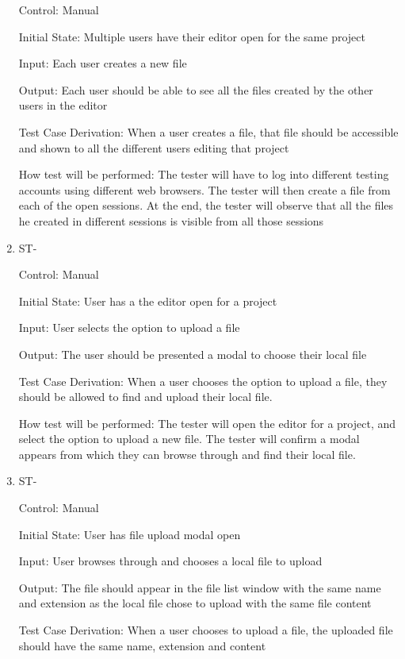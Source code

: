 \documentclass[12pt, titlepage]{article}
\newcounter{TESTID}
\newcommand\TESTNUM{\stepcounter{TESTID}\theTESTID}
\begin{document}
\begin{enumerate}
		Control: Manual
		
		Initial State: Multiple users have their editor open for the same project
		
		Input: Each user creates a new file
		
		Output: Each user should be able to see all the files created by the other users in the editor
		
		Test Case Derivation: When a user creates a file, that file should be accessible and shown to all the different users editing that project
		
		How test will be performed: The tester will have to log into different testing accounts using different web browsers. The tester will then create a file from each of the open sessions. At the end, the tester will observe that all the files he created in different sessions is visible from all those sessions
		
		\item{ST-\TESTNUM\\}
		
		Control: Manual
		
		Initial State: User has a the editor open for a project
		
		Input: User selects the option to upload a file
		
		Output: The user should be presented a modal to choose their local file
		
		Test Case Derivation: When a user chooses the option to upload a file, they should be allowed to find and upload their local file.
		
		How test will be performed: The tester will open the editor for a project, and select the option to upload a new file. The tester will confirm a modal appears from which they can browse through and find their local file.
		
		\item{ST-\TESTNUM\\}
		
		Control: Manual
		
		Initial State: User has file upload modal open
		
		Input: User browses through and chooses a local file to upload
		
		Output:  The file should appear in the file list window with the same name and extension as the local file chose to upload with the same file content
		
		Test Case Derivation: When a user chooses to upload a file, the uploaded file should have the same name, extension and content
		

\end{enumerate}
\end{document}
